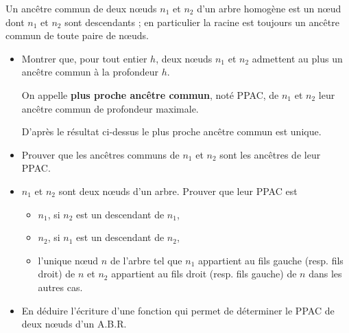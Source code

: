 \begin{Exercise}[title =Ancêtre commun]
Un ancêtre commun de deux nœuds $n_1$ et $n_2$ d'un arbre homogène est un nœud dont $n_1$ et $n_2$ sont descendants ; en particulier la racine est toujours un ancêtre commun de toute paire de nœuds.

\begin{itemize}
\item Montrer que, pour tout entier $h$, deux nœuds $n_1$ et $n_2$ admettent au plus un ancêtre commun à la profondeur $h$.

\medskip

On appelle {\bf plus proche ancêtre commun}, noté PPAC,  de $n_1$ et $n_2$ leur ancêtre commun de profondeur maximale.

D'après le résultat ci-dessus le plus proche ancêtre commun est unique.

\medskip

\item Prouver que les ancêtres communs de $n_1$ et $n_2$ sont les ancêtres de leur PPAC.

\item $n_1$ et $n_2$ sont deux nœuds d'un arbre. Prouver que leur PPAC est
\begin{itemize}
\item $n_1$, si $n_2$ est un descendant de $n_1$,
\item $n_2$, si $n_1$ est un descendant de $n_2$,
\item l'unique nœud $n$ de l'arbre tel que $n_1$ appartient au fils gauche (resp. fils droit) de $n$ et $n_2$ appartient au fils droit (resp. fils gauche) de $n$ dans les autres cas.
\end{itemize}

\item En déduire l'écriture d'une fonction qui permet de déterminer le PPAC de deux nœuds d'un A.B.R.
\end{itemize}
\end{Exercise}
